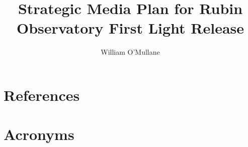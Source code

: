 \documentclass[OPS,authoryear,toc]{lsstdoc}
\title{Strategic Media Plan for Rubin Observatory First Light Release}
\author{%
William O'Mullane
}
\date{\vcsDate}
\begin{document}
\maketitle


\appendix
\section{References} \label{sec:bib}
\renewcommand{\refname}{} %


\section{Acronyms} \label{sec:acronyms}

\end{document}
